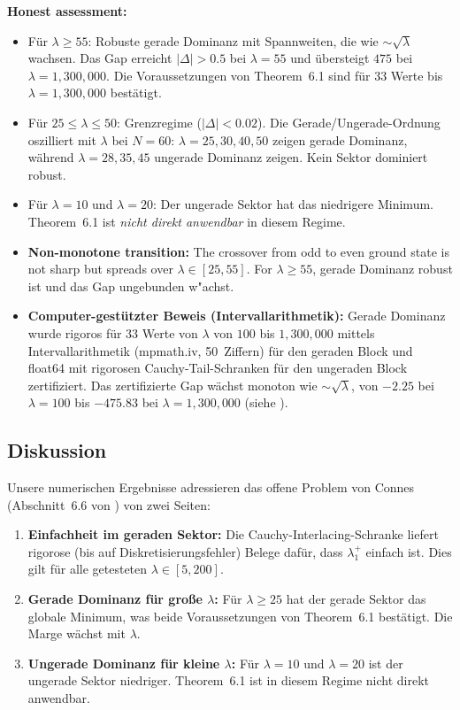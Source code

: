 \documentclass[12pt,a4paper]{article}
\theoremstyle{definition}
\theoremstyle{remark}
\begin{document}
\medskip\noindent
\textbf{Honest assessment:}
\begin{itemize}
  \item Für $\lambda \geq 55$: Robuste gerade Dominanz mit Spannweiten, die wie $\sim\!\sqrt{\lambda}$ wachsen. Das Gap erreicht $|\Delta| > 0.5$ bei $\lambda = 55$ und übersteigt $475$ bei $\lambda = 1{,}300{,}000$. Die Voraussetzungen von Theorem~6.1 sind für $33$ Werte bis $\lambda = 1{,}300{,}000$ bestätigt.
  \item Für $25 \leq \lambda \leq 50$: Grenzregime ($|\Delta| < 0.02$). Die Gerade/Ungerade-Ordnung oszilliert mit $\lambda$ bei $N = 60$: $\lambda = 25, 30, 40, 50$ zeigen gerade Dominanz, während $\lambda = 28, 35, 45$ ungerade Dominanz zeigen. Kein Sektor dominiert robust.
  \item Für $\lambda = 10$ und $\lambda = 20$: Der ungerade Sektor hat das niedrigere Minimum. Theorem~6.1 ist \emph{nicht direkt anwendbar} in diesem Regime.
  \item \textbf{Non-monotone transition:} The crossover from odd to even ground state is not sharp but spreads over $\lambda \in [25, 55]$. For $\lambda \geq 55$, gerade Dominanz robust ist und das Gap ungebunden w"achst.
  \item \textbf{Computer-gestützter Beweis (Intervallarithmetik):} Gerade Dominanz wurde rigoros für $33$ Werte von $\lambda$ von $100$ bis $1{,}300{,}000$ mittels Intervallarithmetik (mpmath.iv, 50~Ziffern) für den geraden Block und float64 mit rigorosen Cauchy-Tail-Schranken für den ungeraden Block zertifiziert. Das zertifizierte Gap wächst monoton wie $\sim\!\sqrt{\lambda}$, von $-2.25$ bei $\lambda = 100$ bis $-475.83$ bei $\lambda = 1{,}300{,}000$ (siehe ).
\end{itemize}

\subsection{Diskussion}

Unsere numerischen Ergebnisse adressieren das offene Problem von Connes (Abschnitt~6.6 von \cite{Connes2025}) von zwei Seiten:
\begin{enumerate}
  \item \textbf{Einfachheit im geraden Sektor:} Die Cauchy-Interlacing-Schranke liefert rigorose (bis auf Diskretisierungsfehler) Belege dafür, dass $\lambda_1^+$ einfach ist. Dies gilt für alle getesteten $\lambda \in [5, 200]$.
  \item \textbf{Gerade Dominanz f\"ur gro\ss e $\lambda$:} F\"ur $\lambda \geq 25$ hat der gerade Sektor das globale Minimum, was beide Voraussetzungen von Theorem~6.1 best\"atigt. Die Marge w\"achst mit $\lambda$.
  \item \textbf{Ungerade Dominanz f\"ur kleine $\lambda$:} F\"ur $\lambda = 10$ und $\lambda = 20$ ist der ungerade Sektor niedriger. Theorem~6.1 ist in diesem Regime nicht direkt anwendbar.
\end{enumerate}
\end{document}

